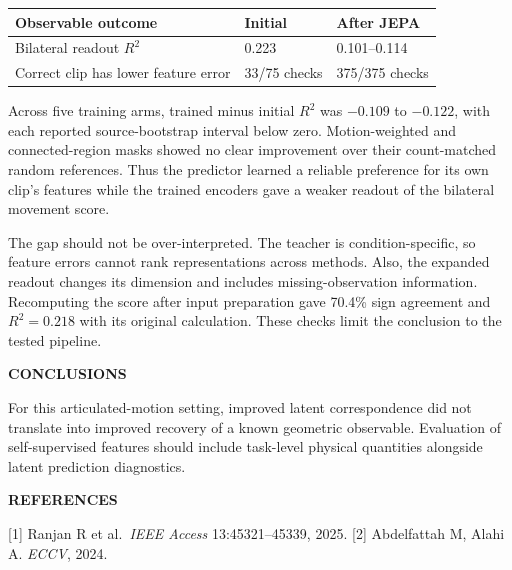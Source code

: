 \documentclass[11pt,letterpaper]{article}
\renewcommand{\subsection}[1]{\vspace{2pt}\noindent\textbf{#1}\par\vspace{1pt}}
\begin{document}
{\def\LTcaptype{none} %
\begin{tabular}{@{}p{}p{}p{}@{}}
\toprule\noalign{}
Observable outcome & Initial & After JEPA \\
\midrule\noalign{}
Bilateral readout \(R^2\) & 0.223 & 0.101--0.114 \\
Correct clip has lower feature error & 33/75 checks & 375/375 checks \\
\end{tabular}
}

Across five training arms, trained minus initial \(R^2\) was \(-0.109\)
to \(-0.122\), with each reported source-bootstrap interval below zero.
Motion-weighted and connected-region masks showed no clear improvement
over their count-matched random references. Thus the predictor learned a
reliable preference for its own clip's features while the trained
encoders gave a weaker readout of the bilateral movement score.

The gap should not be over-interpreted. The teacher is
condition-specific, so feature errors cannot rank representations across
methods. Also, the expanded readout changes its dimension and includes
missing-observation information. Recomputing the score after input
preparation gave 70.4\% sign agreement and \(R^2=0.218\) with its
original calculation. These checks limit the conclusion to the tested
pipeline.

\subsection{CONCLUSIONS}\label{conclusions}

For this articulated-motion setting, improved latent correspondence did
not translate into improved recovery of a known geometric observable.
Evaluation of self-supervised features should include task-level
physical quantities alongside latent prediction diagnostics.

\subsection{REFERENCES}\label{references}

{[}1{]} Ranjan R et al.~\emph{IEEE Access} 13:45321--45339, 2025.
{[}2{]} Abdelfattah M, Alahi A. \emph{ECCV}, 2024.
\end{document}
